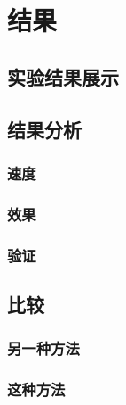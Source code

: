 \newpage
\chapter{结果}
\section{实验结果展示}

\section{结果分析}
\subsection{速度}

\subsection{效果}

\subsection{验证}

\section{比较}
\subsection{另一种方法}

\subsection{这种方法}

